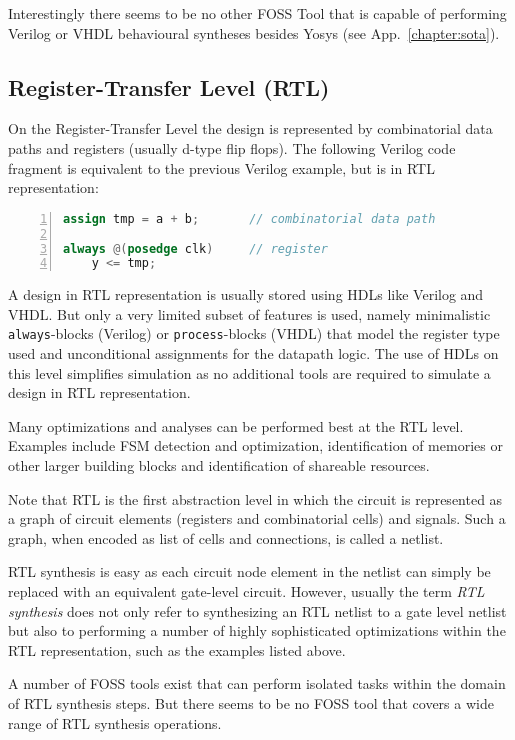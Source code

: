 Interestingly there seems to be no other FOSS Tool that is capable of
performing Verilog or VHDL behavioural syntheses besides Yosys (see
App.~\ref{chapter:sota}).

\subsection{Register-Transfer Level (RTL)}

On the Register-Transfer Level the design is represented by combinatorial data
paths and registers (usually d-type flip flops). The following Verilog code fragment
is equivalent to the previous Verilog example, but is in RTL representation:

\begin{lstlisting}[numbers=left,frame=single,language=Verilog]
assign tmp = a + b;       // combinatorial data path

always @(posedge clk)     // register
	y <= tmp;
\end{lstlisting}

A design in RTL representation is usually stored using HDLs like Verilog and VHDL. But only
a very limited subset of features is used, namely minimalistic {\tt always}-blocks (Verilog)
or {\tt process}-blocks (VHDL) that model the register type used and unconditional assignments
for the datapath logic. The use of HDLs on this level simplifies simulation as no additional
tools are required to simulate a design in RTL representation.

Many optimizations and analyses can be performed best at the RTL level. Examples include FSM
detection and optimization, identification of memories or other larger building blocks
and identification of shareable resources.

Note that RTL is the first abstraction level in which the circuit is represented as a
graph of circuit elements (registers and combinatorial cells) and signals. Such a graph,
when encoded as list of cells and connections, is called a netlist.

RTL synthesis is easy as each circuit node element in the netlist can simply be replaced
with an equivalent gate-level circuit. However, usually the term {\it RTL synthesis} does
not only refer to synthesizing an RTL netlist to a gate level netlist but also to performing
a number of highly sophisticated optimizations within the RTL representation, such as
the examples listed above.

A number of FOSS tools exist that can perform isolated tasks within the domain of RTL
synthesis steps. But there seems to be no FOSS tool that covers a wide range of RTL
synthesis operations.

